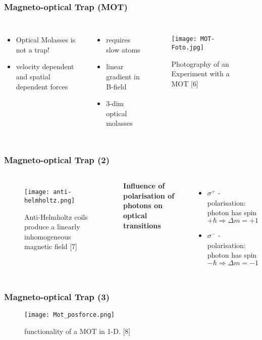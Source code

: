 \documentclass[aspectratio=169]{beamer}
\begin{document}
\begin{frame}
  \frametitle{Magneto-optical Trap (MOT)}
  \begin{columns}
    \begin{itemize}
      \item \alert{Optical Molasses is not a trap!}
      \item velocity dependent and spatial dependent forces
    \end{itemize}
    
    \medskip
    \pause
    \begin{itemize}
      \item requires slow atoms
      \item linear gradient in B-field
      \item 3-dim optical molasses
    \end{itemize}       
    
     \begin{figure}
       \centering
       \texttt{[image: MOT-Foto.jpg]}
       \caption{Photography of an Experiment with a MOT [6]}
     \end{figure} 
  \end{columns}
\end{frame}

\begin{frame}
  \frametitle{Magneto-optical Trap (2)}
  \begin{columns}
     \begin{figure}
     \centering
     \texttt{[image: anti-helmholtz.png]}
     \caption{Anti-Helmholtz coils produce a linearly inhomogeneous magnetic field [7]}    
     \end{figure}    
   \pause
   \textbf{Influence of polarisation of photons on optical transitions}
   \begin{itemize}
     \item $\sigma^+$ - polarisation: photon has spin $+ \hbar \Rightarrow \Delta m=+1$
     \item $\sigma^-$ - polarisation: photon has spin $- \hbar \Rightarrow \Delta m=-1$
   \end{itemize}
     
  \end{columns}
  
\end{frame}

\begin{frame}
  \frametitle{Magneto-optical Trap (3)}
  \begin{figure}
    \centering
    \texttt{[image: Mot\_posforce.png]}
    \caption{functionality of a MOT in 1-D. [8]}
  \end{figure}
\end{frame}
\end{document}
